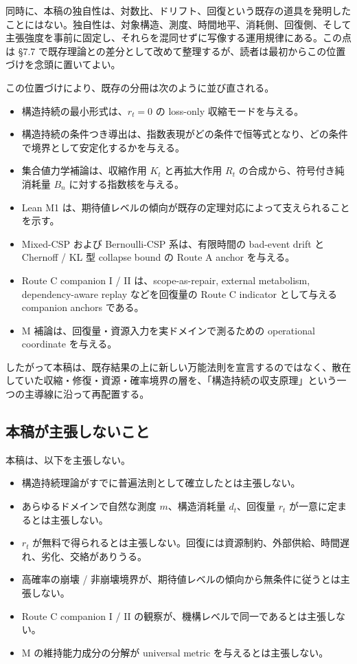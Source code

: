 \documentclass[12pt,a4paper]{article}
\begin{document}
同時に、本稿の独自性は、対数比、ドリフト、回復という既存の道具を発明したことにはない。独自性は、対象構造、測度、時間地平、消耗側、回復側、そして主張強度を事前に固定し、それらを混同せずに写像する運用規律にある。この点は §7.7 で既存理論との差分として改めて整理するが、読者は最初からこの位置づけを念頭に置いてよい。

この位置づけにより、既存の分冊は次のように並び直される。

\begin{itemize}
\tightlist
\item
  構造持続の最小形式は、\(r_{t}=0\) の loss-only 収縮モードを与える。
\item
  構造持続の条件つき導出は、指数表現がどの条件で恒等式となり、どの条件で境界として安定化するかを与える。
\item
  集合値力学補論は、収縮作用 \(K_{t}\) と再拡大作用 \(R_{t}\) の合成から、符号付き純消耗量 \(B_{n}\) に対する指数核を与える。
\item
  Lean M1 は、期待値レベルの傾向が既存の定理対応によって支えられることを示す。
\item
  Mixed-CSP および Bernoulli-CSP 系は、有限時間の bad-event drift と Chernoff / KL 型 collapse bound の Route A anchor を与える。
\item
  Route C companion I / II は、scope-as-repair, external metabolism, dependency-aware replay などを回復量の Route C indicator として与える companion anchors である。
\item
  M 補論は、回復量・資源入力を実ドメインで測るための operational coordinate を与える。
\end{itemize}

したがって本稿は、既存結果の上に新しい万能法則を宣言するのではなく、散在していた収縮・修復・資源・確率境界の層を、「構造持続の収支原理」という一つの主導線に沿って再配置する。

\subsection{本稿が主張しないこと}\label{ux672cux7a3fux304cux4e3bux5f35ux3057ux306aux3044ux3053ux3068}

本稿は、以下を主張しない。

\begin{itemize}
\tightlist
\item
  構造持続理論がすでに普遍法則として確立したとは主張しない。
\item
  あらゆるドメインで自然な測度 \(m\)、構造消耗量 \(d_{t}\)、回復量 \(r_{t}\) が一意に定まるとは主張しない。
\item
  \(r_{t}\) が無料で得られるとは主張しない。回復には資源制約、外部供給、時間遅れ、劣化、交絡がありうる。
\item
  高確率の崩壊 / 非崩壊境界が、期待値レベルの傾向から無条件に従うとは主張しない。
\item
  Route C companion I / II の観察が、機構レベルで同一であるとは主張しない。
\item
  M の維持能力成分の分解が universal metric を与えるとは主張しない。
\end{itemize}
\end{document}
